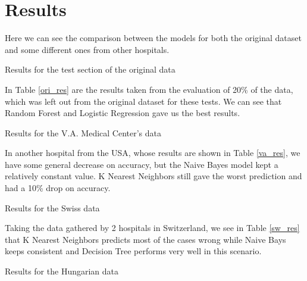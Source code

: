 \documentclass[conference]{IEEEtran}
\begin{document}
\section{Results}

Here we can see the comparison between the models for both the original dataset and some different ones from other hospitals.

\begin{table}[H]
    \caption{Results for the test section of the original data}
    \begin{center}
        
        \label{ori_res}
    \end{center}
\end{table}

In Table \ref{ori_res} are the results taken from the evaluation of 20\% of the data, which was left out from the original dataset for these tests. We can see that Random Forest and Logistic Regression gave us the best results.

\begin{table}[H]
    \caption{Results for the V.A. Medical Center's data}
    \begin{center}
        
        \label{va_res}
    \end{center}
\end{table}

In another hospital from the USA\cite{va}, whose results are shown in Table \ref{va_res}, we have some general decrease on accuracy, but the Naive Bayes model kept a relatively constant value. K Nearest Neighbors still gave the worst prediction and had a 10\% drop on accuracy.

\begin{table}[H]
    \caption{Results for the Swiss data}
    \begin{center}
        
        \label{sw_res}
    \end{center}
\end{table}

Taking the data gathered by 2 hospitals in Switzerland\cite{swz1,swz2}, we see in Table \ref{sw_res} that K Nearest Neighbors predicts most of the cases wrong while Naive Bays keeps consistent and Decision Tree performs very well in this scenario.

\begin{table}[H]
    \caption{Results for the Hungarian data}
    \begin{center}
        
        \label{hun_res}
    \end{center}
\end{table}
\end{document}

